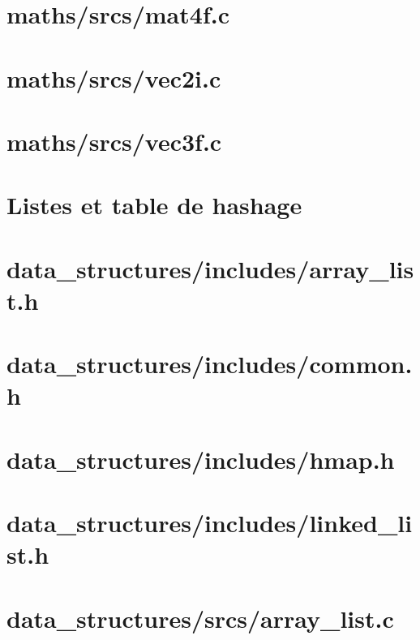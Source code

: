 \documentclass{article}
\begin{document}
\section*{maths/srcs/mat4f.c}


\section*{maths/srcs/vec2i.c}


\section*{maths/srcs/vec3f.c}


\section{Listes et table de hashage}

\section*{data\_structures/includes/array\_list.h}


\section*{data\_structures/includes/common.h}


\section*{data\_structures/includes/hmap.h}


\section*{data\_structures/includes/linked\_list.h}


\section*{data\_structures/srcs/array\_list.c}

\end{document}
